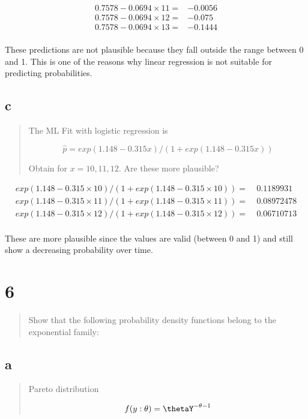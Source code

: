 \documentclass[11pt]{article}
\begin{document}
\begin{equation}
\begin{split}
0.7578 - 0.0694 \times 11 = & -0.0056\\
0.7578 - 0.0694 \times 12 = & -0.075\\
0.7578 - 0.0694 \times 13 = & -0.1444\\
\end{split}
\end{equation}

These predictions are not plausible because they fall outside the range between
0 and 1. This is one of the reasons why linear regression is not suitable for
predicting probabilities.

\subsection{c}
\label{sec:org0bc19f6}
\begin{quote}
The ML Fit with logistic regression is

$$
\hat p = exp(1.148 - 0.315 x) /(1 + exp(1.148 - 0.315 x))
$$

Obtain for \(x = 10,11,12\). Are these more plausible?
\end{quote}

\begin{equation}
\begin{split}
exp(1.148 - 0.315 \times 10) /(1 + exp(1.148 - 0.315 \times 10)) = & \ 0.1189931\\
exp(1.148 - 0.315 \times 11) /(1 + exp(1.148 - 0.315 \times 11)) = & \ 0.08972478\\
exp(1.148 - 0.315 \times 12) /(1 + exp(1.148 - 0.315 \times 12)) = & \ 0.06710713\\
\end{split}
\end{equation}

These are more plausible since the values are valid (between 0 and 1) and still show a
decreasing probability over time.

\section{6}
\label{sec:org6a9d4b7}
\begin{quote}
Show that the following probability density functions belong to the exponential family:
\end{quote}

\subsection{a}
\label{sec:orgc756119}
\begin{quote}
Pareto distribution

$$
f(y: \theta) = \thetaY^{-\theta-1}
$$
\end{quote}
\end{document}
